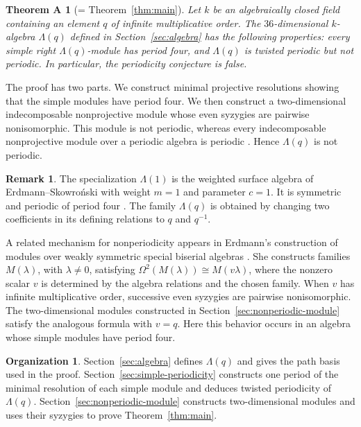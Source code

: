 \documentclass[a4paper,reqno,10pt]{amsart}
\newtheorem*{theoremA}{Theorem A}
\theoremstyle{definition}
\newtheorem{remark}[theorem]{Remark}
\newtheorem*{organization}{Organization}
\numberwithin{equation}{section}
\newcommand{\kfield}{k}
\begin{document}
\begin{theoremA}[= Theorem~\ref{thm:main}]
Let $\kfield$ be an algebraically closed field containing an element $q$ of
infinite multiplicative order. The $36$-dimensional $\kfield$-algebra
$\Lambda(q)$ defined in Section~\ref{sec:algebra} has the following
properties: every simple right $\Lambda(q)$-module has period four, and
$\Lambda(q)$ is twisted periodic but not periodic. In particular, the
periodicity conjecture is false.
\end{theoremA}

The proof has two parts. We construct minimal projective resolutions showing
that the simple modules have period four. We then construct a two-dimensional
indecomposable nonprojective module whose even syzygies are pairwise
nonisomorphic. This module is not periodic, whereas every indecomposable
nonprojective module over a periodic algebra is periodic
\cite[Theorem~IV.11.19(ii)]{SkowronskiYamagata}. Hence $\Lambda(q)$ is not periodic.

\begin{remark}
The specialization $\Lambda(1)$ is the weighted surface algebra of
Erdmann--Skowro\'nski \cite[Example~5.11]{ErdmannSkowronskiSurface} with
weight $m=1$ and parameter $c=1$. It is symmetric and periodic of period
four \cite[Theorems~1.1 and~1.2]{ErdmannSkowronskiSurface}. The family
$\Lambda(q)$ is obtained by changing two coefficients in its defining
relations to $q$ and $q^{-1}$.

A related mechanism for nonperiodicity appears in Erdmann's construction
of modules over weakly symmetric special biserial algebras
\cite[Section~3]{ErdmannBounded}. She constructs families $M(\lambda)$, with $\lambda\ne0$,
satisfying $\Omega^2(M(\lambda))\cong M(v\lambda)$, where the nonzero
scalar $v$ is determined by the algebra relations and the chosen family.
When $v$ has infinite multiplicative order, successive even syzygies are
pairwise nonisomorphic. The two-dimensional modules constructed in
Section~\ref{sec:nonperiodic-module} satisfy the analogous formula with
$v=q$. Here this behavior occurs in an algebra whose simple modules have
period four.
\end{remark}

\begin{organization}
Section~\ref{sec:algebra} defines $\Lambda(q)$ and gives the path basis used
in the proof. Section~\ref{sec:simple-periodicity} constructs one period of
the minimal resolution of each simple module and deduces twisted periodicity
of $\Lambda(q)$. Section~\ref{sec:nonperiodic-module} constructs two-dimensional modules and
uses their syzygies to prove Theorem~\ref{thm:main}.
\end{organization}
\end{document}
